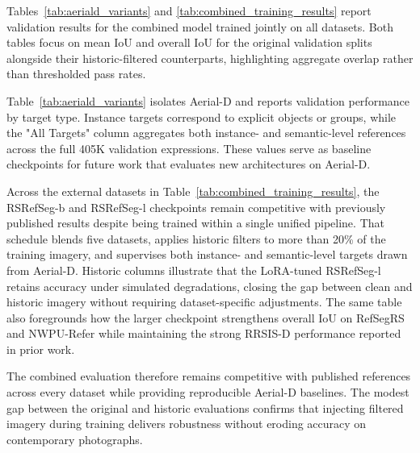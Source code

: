 Tables~\ref{tab:aeriald_variants} and \ref{tab:combined_training_results} report validation results for the combined model trained jointly on all datasets. Both tables focus on mean IoU and overall IoU for the original validation splits alongside their historic-filtered counterparts, highlighting aggregate overlap rather than thresholded pass rates.

Table~\ref{tab:aeriald_variants} isolates Aerial-D and reports validation performance by target type. Instance targets correspond to explicit objects or groups, while the "All Targets" column aggregates both instance- and semantic-level references across the full 405K validation expressions. These values serve as baseline checkpoints for future work that evaluates new architectures on Aerial-D.

Across the external datasets in Table~\ref{tab:combined_training_results}, the RSRefSeg-b and RSRefSeg-l checkpoints remain competitive with previously published results despite being trained within a single unified pipeline. That schedule blends five datasets, applies historic filters to more than 20\% of the training imagery, and supervises both instance- and semantic-level targets drawn from Aerial-D. Historic columns illustrate that the LoRA-tuned RSRefSeg-l retains accuracy under simulated degradations, closing the gap between clean and historic imagery without requiring dataset-specific adjustments. The same table also foregrounds how the larger checkpoint strengthens overall IoU on RefSegRS and NWPU-Refer while maintaining the strong RRSIS-D performance reported in prior work.

The combined evaluation therefore remains competitive with published references across every dataset while providing reproducible Aerial-D baselines. The modest gap between the original and historic evaluations confirms that injecting filtered imagery during training delivers robustness without eroding accuracy on contemporary photographs.

\begin{table}[t]
\centering
\caption{Aerial-D supervision variants evaluated on the validation split (historic scores in \textcolor{blue}{blue}; ``--'' denotes metrics that are not yet available).}
\label{tab:aeriald_variants}
\end{table}

